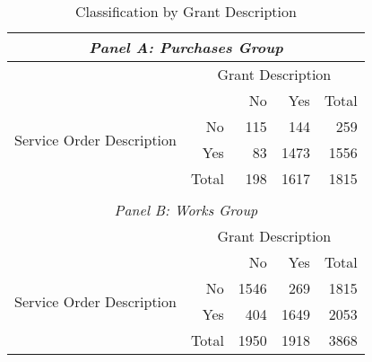 \begin{table}[!htbp]
  \caption{\label{tab:textualdescription}Classification by Grant Description}
  \centering
  \footnotesize
  \begin{tabular}{crrrr}
    \hline

    \hline
    \multicolumn{5}{c}{\emph{Panel A: Purchases Group}} \T \B \\
    \hline
    & \multicolumn{4}{c}{\parbox{.25\textwidth}{\centering Grant Description}} \T \B \\
    \multicolumn{1}{c}{\multirow{4}{*}{\parbox[c][][c]{.15\textwidth}{\centering Service Order Description}}} & \multicolumn{1}{l}{} & No & Yes & Total \T \B \\
                         \cline{2-5}
    \multicolumn{1}{c}{} & No        & 115       & 144       & 259  \T \B \\
    \multicolumn{1}{c}{} & Yes       & 83        & 1473      & 1556 \T \B \\
                         \cline{2-5}
    \multicolumn{1}{c}{} & Total     & 198       & 1617      & 1815 \T \B \\
    & & & & \\
    \hline
    \multicolumn{5}{c}{\emph{Panel B: Works Group}} \T \B \\
    \hline
    & \multicolumn{4}{c}{\parbox{.25\textwidth}{\centering Grant Description}} \T \B \\
    \multirow{4}{*}{\parbox[c][][c]{.15\textwidth}{\centering Service Order Description}}                     & \multicolumn{1}{l}{} & No & Yes & Total \T \B \\
                         \cline{2-5}
                         & No        & 1546      & 269       & 1815 \T \B \\
                         & Yes       & 404       & 1649      & 2053 \T \B \\
                         \cline{2-5}
                         & Total     & 1950      & 1918      & 3868 \T \B \\
    \hline

    \hline
  \end{tabular}
\end{table}